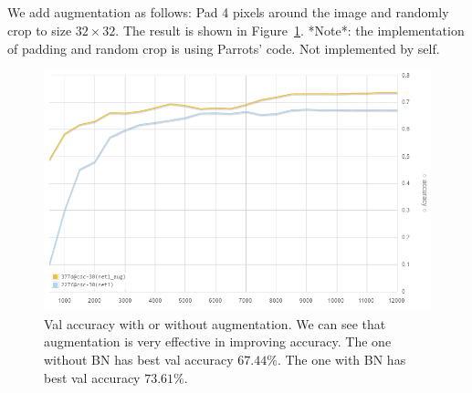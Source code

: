 \subsection{} %

We add augmentation as follows:
Pad 4 pixels around the image and randomly crop to size $32\times 32$.
The result is shown in Figure~\ref{fig:aug}.
*Note*: the implementation of padding and random crop
is using Parrots' code.
Not implemented by self.

\begin{figure}[ht]
\centering
    \includegraphics[width=0.9\linewidth]{fig/aug}
    \caption{\small
    Val accuracy with or without augmentation.
    We can see that augmentation is very effective in improving accuracy.
    The one without BN has best val accuracy $67.44\%$.
    The one with BN has best val accuracy $73.61\%$.}
    \label{fig:aug}
\end{figure}
